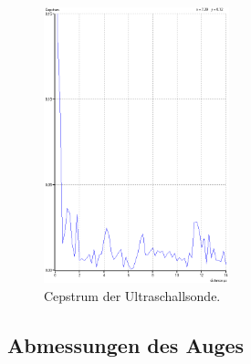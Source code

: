 \begin{figure}
  \centering
  \includegraphics[height=8cm]{data/Cepstrum.png}
  \caption{Cepstrum der Ultraschallsonde.}
  \label{fig:cep}
\end{figure}

\FloatBarrier

\subsection{Abmessungen des Auges}

